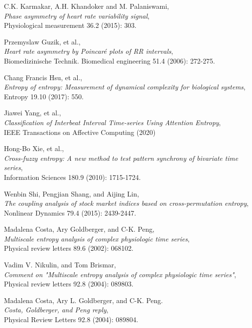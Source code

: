 \documentclass[12pt, a4paper, titlepage, openany]{book}
\begin{document}
\begin{thebibliography}{9}
C.K. Karmakar, A.H. Khandoker and M. Palaniswami,\\
\emph{Phase asymmetry of heart rate variability signal},\\
Physiological measurement 36.2 (2015): 303.

Przemyslaw Guzik, et al.,\\
\emph{Heart rate asymmetry by Poincaré plots of RR intervals},\\
Biomedizinische Technik. Biomedical engineering 51.4 (2006): 272-275.

Chang Francis Hsu, et al.,\\
\emph{Entropy of entropy: Measurement of dynamical complexity for biological systems},\\
Entropy 19.10 (2017): 550.

Jiawei Yang, et al.,\\
\emph{Classification of Interbeat Interval Time-series Using Attention Entropy},\\
IEEE Transactions on Affective Computing (2020)

Hong-Bo Xie, et al.,\\
\emph{Cross-fuzzy entropy: A new method to test pattern synchrony of bivariate time series},\\
Information Sciences 180.9 (2010): 1715-1724.

Wenbin Shi, Pengjian Shang, and Aijing Lin,\\
\emph{The coupling analysis of stock market indices based on cross-permutation entropy},
Nonlinear Dynamics 79.4 (2015): 2439-2447.

Madalena Costa, Ary Goldberger, and C-K. Peng,\\
\emph{Multiscale entropy analysis of complex physiologic time series},\\
Physical review letters  89.6 (2002): 068102.

Vadim V. Nikulin, and Tom Brismar,\\
\emph{Comment on "Multiscale entropy analysis of complex physiologic time series"},\\
Physical review letters  92.8 (2004): 089803.

Madalena Costa, Ary L. Goldberger, and C-K. Peng. \\
\emph{Costa, Goldberger, and Peng reply},\\
Physical Review Letters 92.8 (2004): 089804.
                

\end{thebibliography}
\end{document}
